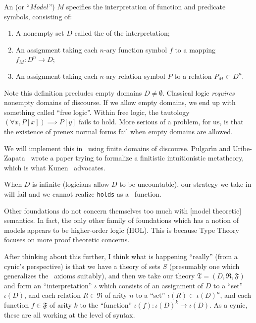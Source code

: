 \begin{node}[Semantics]\label{fol-0005}%
\begin{definition}\label{fol-0006}%
An  (or ``\textit{Model}\,'') $M$ specifies the
interpretation of function and predicate symbols, consisting of:
\begin{enumerate}
\item A nonempty set $D$ called the  of the interpretation;
\item An assignment taking each $n$-ary function symbol $f$ to a mapping
  $f_{M}\colon D^{n}\to D$;
\item An assignment taking each $n$-ary relation symbol $P$ to a
  relation $P_{M}\subset D^{n}$.
\end{enumerate}
\begin{node}\label{fol-000A}%
Note this definition precludes empty domains $D\neq\emptyset$. Classical
logic \emph{requires} nonempty domains of discourse. If we allow empty
domains, we end up with something called ``free logic''. Within free
logic, the tautology $(\forall x,P[x])\implies P[y]$ fails to hold.
More serious of a problem, for us, is that the existence of prenex
normal forms fail when empty domains are allowed.
\end{node}

\begin{node}\label{fol-000B}%
We will implement this in \SML\ using finite domains of discourse.
Pulgar\'{\i}n and Uribe-Zapata~\cite{pulgarin2023came} wrote a paper
trying to formalize a finitistic intuitionistic metatheory, which is
what Kunen~\cite{kunen2009foundations} advocates.

When $D$ is infinite (logicians allow $D$ to be uncountable), our
strategy we take in  will fail and we cannot realize
\texttt{holds} as a \SML\ function.
\end{node}

\begin{node}\label{fol-000C}%
Other foundations do not concern themselves too much with
[model theoretic] semantics. In fact, the only other family of
foundations which has a notion of models appears to be higher-order
logic (HOL). This is because Type Theory focuses on more proof theoretic
concerns.

\begin{node}\label{fol-000H}%
After thinking about this further, I think what is happening ``really''
(from a cynic's perspective) is that we have a theory of sets $S$
(presumably one which generalizes the \ZF\ axioms suitably), and then we
take our theory $\mathfrak{T}=(D,\mathfrak{R},\mathfrak{F})$ and form an ``interpretation''
$\iota$ which consists of an assignment of $D$ to a ``set'' $\iota(D)$,
and each relation $R\in\mathfrak{R}$ of arity $n$ to a ``set''
$\iota(R)\subset\iota(D)^{n}$, and each function $f\in\mathfrak{F}$ of
arity $k$ to the ``function'' $\iota(f)\colon\iota(D)^{k}\to\iota(D)$.
As a cynic, these are all working at the level of syntax.


\end{node}
\end{node}
\end{definition}
\end{node}
